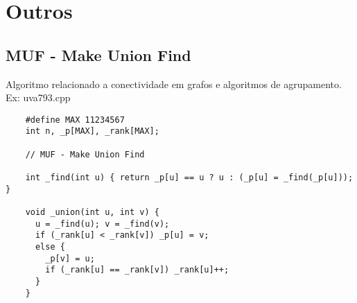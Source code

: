 \section{Outros}

\subsection{MUF - Make Union Find}

Algoritmo relacionado a conectividade em grafos e algoritmos de agrupamento. Ex: uva793.cpp

\begin{verbatim}
    #define MAX 11234567
    int n, _p[MAX], _rank[MAX];
    
    // MUF - Make Union Find
    
    int _find(int u) { return _p[u] == u ? u : (_p[u] = _find(_p[u])); }
    
    void _union(int u, int v) {
      u = _find(u); v = _find(v);
      if (_rank[u] < _rank[v]) _p[u] = v;
      else {
        _p[v] = u;
        if (_rank[u] == _rank[v]) _rank[u]++;
      }
    }
\end{verbatim}

